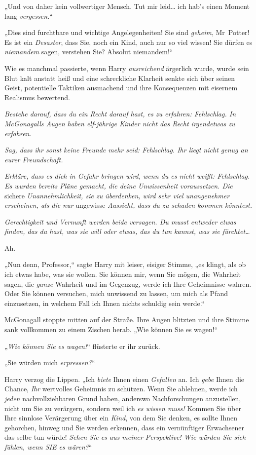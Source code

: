 {„Und von daher kein vollwertiger Mensch. Tut mir leid… ich hab's einen Moment lang \emph{vergessen.}“

„Dies sind furchtbare und wichtige Angelegenheiten! Sie sind \emph{geheim}, Mr~Potter! Es ist ein \emph{Desaster}, dass Sie, noch ein Kind, auch nur so viel wissen! Sie dürfen es \emph{niemandem} sagen, verstehen Sie? Absolut niemandem!“

Wie es manchmal passierte, wenn Harry \emph{ausreichend} ärgerlich wurde, wurde sein Blut kalt anstatt heiß und eine schreckliche Klarheit senkte sich über seinen Geist, potentielle Taktiken ausmachend und ihre Konsequenzen mit eisernem Realismus bewertend.

\emph{Bestehe darauf, dass du ein Recht darauf hast, es zu erfahren: Fehlschlag. In McGonagalls Augen haben elf-jährige Kinder nicht das Recht irgendetwas zu erfahren.}

\emph{Sag, dass ihr sonst keine Freunde mehr seid: Fehlschlag. Ihr liegt nicht genug an eurer Freundschaft.}

\emph{Erkläre, dass es dich in Gefahr bringen wird, wenn du es nicht weißt: Fehlschlag. Es wurden bereits Pläne gemacht, die deine Unwissenheit voraussetzen. Die} sichere \emph{Unannehmlichkeit, sie zu überdenken, wird sehr viel unangenehmer erscheinen, als die nur} ungewisse \emph{Aussicht, dass du zu schaden kommen könntest.}

\emph{Gerechtigkeit und Vernunft werden beide versagen. Du musst entweder etwas finden, das du hast, was sie will oder etwas, das du tun kannst, was sie fürchtet…}

Ah.

„Nun denn, Professor,“ sagte Harry mit leiser, eisiger Stimme, „es klingt, als ob ich etwas habe, was sie wollen. Sie können mir, wenn Sie mögen, die Wahrheit sagen, die \emph{ganze} Wahrheit und im Gegenzug, werde ich Ihre Geheimnisse wahren. Oder Sie können versuchen, mich unwissend zu lassen, um mich als Pfand einzusetzen, in welchem Fall ich Ihnen nichts schuldig sein werde.“

McGonagall stoppte mitten auf der Straße. Ihre Augen blitzten und ihre Stimme sank vollkommen zu einem Zischen herab. „Wie können Sie es wagen!“

„\emph{Wie können Sie es wagen!}“ flüsterte er ihr zurück.

„Sie würden mich \emph{erpressen?}“

Harry verzog die Lippen. „Ich \emph{biete} Ihnen einen \emph{Gefallen} an. Ich \emph{gebe} Ihnen die Chance, \emph{Ihr} wertvolles Geheimnis zu schützen. Wenn Sie ablehnen, werde ich \emph{jeden} nachvollziehbaren Grund haben, anderswo Nachforschungen anzustellen, nicht um Sie zu verärgern, sondern weil ich \emph{es wissen muss!} Kommen Sie über Ihre sinnlose Verärgerung über ein \emph{Kind}, von dem Sie denken, es sollte Ihnen gehorchen, hinweg und Sie werden erkennen, dass ein vernünftiger Erwachsener das selbe tun würde! \emph{Sehen Sie es aus meiner Perspektive! Wie würden Sie sich fühlen, wenn SIE es wären?}“

}
